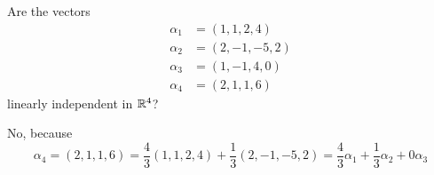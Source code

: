 \documentclass[a4paper, 11pt]{article}
\begin{document}
\begin{problem} 
Are the vectors
\begin{align*}
    \alpha_1 & = (1, 1, 2, 4)   \\
    \alpha_2 & = (2, -1, -5, 2) \\
    \alpha_3 & = (1, -1, 4, 0)  \\
    \alpha_4 & = (2, 1, 1, 6)
\end{align*}
linearly independent in \(\mathbb{R}^4\)?
\end{problem}
\begin{solution}
    No, because \[
        \alpha_4 = (2, 1, 1, 6) = \frac{4}{3} (1, 1, 2, 4) + \frac{1}{3} (2, -1, -5, 2) = \frac{4}{3} \alpha_1 + \frac{1}{3} \alpha_2 + 0\alpha_3
    \]
\end{solution}
\end{document}
